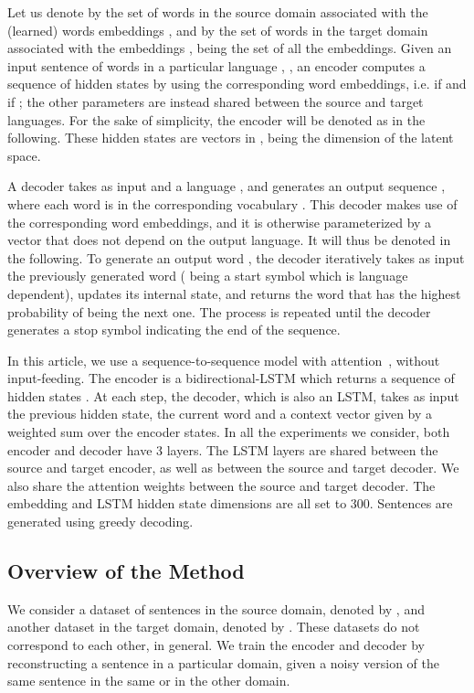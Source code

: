 \documentclass{article} \usepackage{iclr2018_conference,times}
\begin{document}
Let us denote by  the set of words in the source domain associated with the (learned) words embeddings , and by  the set of words in the target domain associated with the embeddings ,  being the set of all the embeddings. Given an input sentence of  words  in a particular language , , an encoder  computes a sequence of  hidden states  by using the corresponding word embeddings, i.e.  if  and  if ; the other parameters  are instead shared between the source and target languages. For the  sake of simplicity, the encoder will be denoted as  in the following. These hidden states are vectors in  ,  being the dimension of the latent space. 

A decoder  takes as input  and a language , and generates an output sequence , where each word  is in the corresponding vocabulary . This decoder makes use of the corresponding word embeddings, and it is otherwise parameterized by a vector  that does not depend on the output language. It will thus be denoted  in the following. To generate an output word , the decoder iteratively takes as input the previously generated word  ( being a start symbol which is language dependent), updates its internal state, and returns the word that has the highest probability of being the next one. The process is repeated until the decoder generates a stop symbol indicating the end of the sequence. 

In this article, we use a sequence-to-sequence model with attention~\citep{attentionNMT}, without input-feeding. The encoder is a bidirectional-LSTM which returns a sequence of hidden states . At each step, the decoder, which is also an LSTM, takes as input the previous hidden state, the current word and a context vector given by a weighted sum over the encoder states. In all the experiments we consider, both encoder and decoder have 3 layers. The LSTM layers are shared between the source and target encoder, as well as between the source and target decoder. We also share the attention weights between the source and target decoder. The embedding and LSTM hidden state dimensions are all set to 300. Sentences are generated using greedy decoding.



\subsection{Overview of the Method}

We consider a dataset of sentences in the source domain, denoted by , and another dataset in the target domain, denoted by . These datasets do not  correspond to each other, in general. We train the encoder and decoder by reconstructing a sentence in a particular domain, given a noisy version of the same sentence in the same or in the other domain. 
\end{document}
